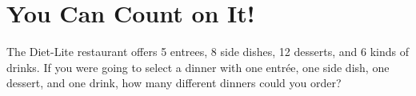 \newpage
\section{You Can Count on It!}\label{A:countOnIt}


%
%

%
%
%
%
%
%
%
%


\begin{prob}
The Diet-Lite restaurant offers 5 entrees, 8 side dishes, 12 desserts,
and 6 kinds of drinks.  If you were going to select a dinner with one
entr\'ee, one side dish, one dessert, and one drink, how many different
dinners could you order?
\end{prob}

